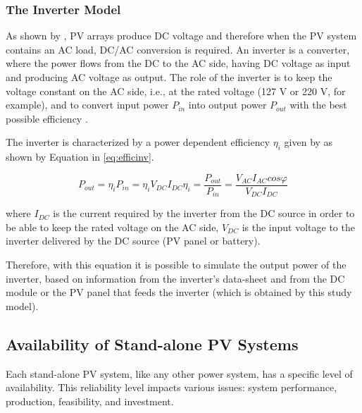 \subsubsection{The Inverter Model}
As shown by \cite{Mellit}, PV arrays produce DC voltage and therefore when the PV system contains an AC load, DC/AC conversion is required. An inverter is a converter, where the power flows from the DC to the AC side, having DC voltage as input and producing AC voltage as output. The role of the inverter is to keep the voltage constant on the AC side, i.e., at the rated voltage (127 V or 220 V, for example), and to convert input power $ P_{in} $ into  output power $ P_{out} $ with the best possible efficiency \cite{Hansen}.

The inverter is characterized by a power dependent efficiency $ \eta_{i} $ given by \cite{Hansen} as shown by Equation in  \ref{eq:efficinv}.

\begin{equation}
\label{eq:efficinv}
P_{out} = \eta_{i} P_{in} = \eta_{i} V_{DC} I_{DC}
\eta_{i} = \dfrac{P_{out}}{P_{in}} = \dfrac{V_{AC} I_{AC} cos\varphi}{V_{DC}I_{DC}}
\end{equation}

\noindent where $ I_{DC} $ is the current required by the inverter from the DC source in order to be able to keep the rated voltage on the AC side, $ V_{DC} $ is the input voltage to the inverter delivered by the DC source (PV panel or battery). %

Therefore, with this equation it is possible to simulate the output power of the inverter, based on information from the inverter's data-sheet and from the DC module or the PV panel that feeds the inverter (which is obtained by this study model).

\subsection{Availability of Stand-alone PV Systems}
\label{sec:availability}

Each stand-alone PV system, like any other power system, has a specific level of availability. This reliability level impacts various issues: system performance, production, feasibility, and investment. 

